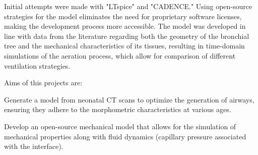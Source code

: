 Initial attempts were made with "LTspice" and "CADENCE." Using
open-source strategies for the model eliminates the need for
proprietary software licenses, making the development process more
accessible. The model was developed in line with data from the
literature regarding both the geometry of the bronchial tree and the
mechanical characteristics of its tissues, resulting in time-domain
simulations of the aeration process, which allow for comparison of
different ventilation strategies\cite{mani2020}.


Aims of this projects are:
\begin{description}
\item Generate a model from neonatal CT scans to optimize the
  generation of airways, ensuring they adhere to the morphometric
  characteristics at various ages.
\item Develop an open-source mechanical model that allows for the
  simulation of mechanical properties along with fluid dynamics
  (capillary pressure associated with the interface).
\end{description}








